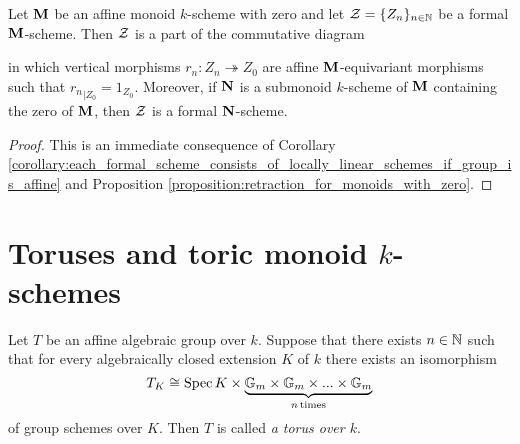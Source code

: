 \begin{corollary}\label{corollary:restraction_for_formal_schemes_and_pointed_submonoids}
Let $\mathbf{M}$ be an affine monoid $k$-scheme with zero and let ${\mathcal Z} = \{Z_n\}_{n\in {\mathbb N}}$ be a formal $\mathbf{M}$-scheme. Then ${\mathcal Z}$ is a part of the commutative diagram
\begin{center}
\end{center}
in which vertical morphisms $r_n:Z_n\twoheadrightarrow Z_0$ are affine $\mathbf{M}$-equivariant morphisms such that ${r_n}_{\mid Z_0} = 1_{Z_0}$. Moreover, if $\mathbf{N}$ is a submonoid $k$-scheme of $\mathbf{M}$ containing the zero of $\mathbf{M}$, then ${\mathcal Z}$ is a formal $\mathbf{N}$-scheme.
\end{corollary}
\begin{proof}
This is an immediate consequence of Corollary \ref{corollary:each_formal_scheme_consists_of_locally_linear_schemes_if_group_is_affine} and Proposition \ref{proposition:retraction_for_monoids_with_zero}.
\end{proof}

\section{Toruses and toric monoid $k$-schemes}

\begin{definition}
Let $T$ be an affine algebraic group over $k$. Suppose that there exists $n\in {\mathbb N}$ such that for every algebraically closed extension $K$ of $k$ there exists an isomorphism
$$T_K \cong  \mathrm{Spec}\, K \times \underbrace{\mathbb{G}_{m}\times \mathbb{G}_{m}\times ...\times \mathbb{G}_{m}}_{n\,\mathrm{times}} $$
of group schemes over $K$. Then $T$ is called \textit{a torus over $k$}.
\end{definition}

